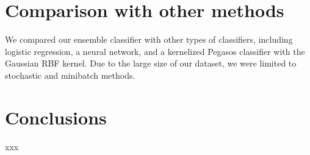 \documentclass{article}
\begin{document}
\begin{multicols}{2}
\section{Comparison with other methods}

We compared our ensemble classifier
with other types of classifiers,
including logistic regression, a neural network,
and a kernelized Pegasos classifier
with the Gaussian RBF kernel.
Due to the large size of our dataset,
we were limited to
stochastic and minibatch methods.

\section{Conclusions}

xxx

\end{multicols}
\end{document}
